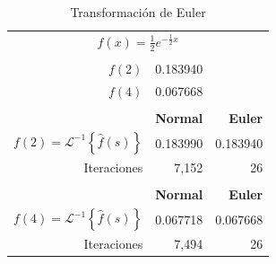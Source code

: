 \documentclass[11pt]{article}
\numberwithin{equation}{section} %
\begin{document}
\begin{table}[htbp]
\centering
\caption{Transformación de Euler}
\begin{tabular}{r r r}
\multicolumn{3}{c}{$f(x)=\frac{1}{2}e^{-\frac{1}{2}x}$} \\
\\
$f(2)$ & 0.183940 & \\
$f(4)$ & 0.067668 & \\
\\
& \bf{Normal} & \bf{Euler} \\
$f(2)=\mathcal{L}^{-1}\left\{\hat{f}(s)\right\}$ & 0.183990 & 0.183940 \\
Iteraciones & 7,152 & 26 \\
\\
& \bf{Normal} & \bf{Euler} \\
$f(4)=\mathcal{L}^{-1}\left\{\hat{f}(s)\right\}$ & 0.067718 & 0.067668 \\
Iteraciones & 7,494 & 26 \\
\end{tabular}%
\label{tab:euler}%
\end{table}%

\clearpage

\listoftables
\clearpage

\listoffigures
\clearpage

\nocite{*}



\end{document}
